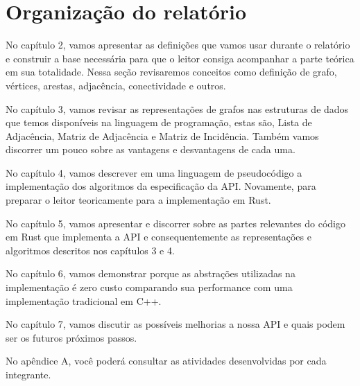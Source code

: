 
\section{Organização do relatório}

No capítulo 2, vamos apresentar as definições que vamos usar durante
o relatório e construir a base necessária para que o leitor consiga
acompanhar a parte teórica em sua totalidade. Nessa seção revisaremos conceitos
como definição de grafo, vértices, arestas, adjacência,
conectividade e outros.

No capítulo 3, vamos revisar as representações de grafos nas
estruturas de dados que temos disponíveis na linguagem de
programação, estas são, Lista de Adjacência, Matriz de Adjacência e
Matriz de Incidência. Também vamos discorrer um pouco sobre as
vantagens e desvantagens de cada uma.

No capítulo 4, vamos descrever em uma linguagem de pseudocódigo a
implementação dos algoritmos da especificação da API. Novamente, para
preparar o leitor teoricamente para a implementação em Rust.

No capítulo 5, vamos apresentar e discorrer sobre as partes relevantes
do código em Rust que implementa a API e consequentemente as representações e
algoritmos descritos nos capítulos 3 e 4.

No capítulo 6, vamos demonstrar porque as abstrações utilizadas na
implementação é zero custo comparando sua performance com uma
implementação tradicional em C++.

No capítulo 7, vamos discutir as possíveis melhorias a nossa API e quais
podem ser os futuros próximos passos.

No apêndice A, você poderá consultar as atividades desenvolvidas por
cada integrante.
